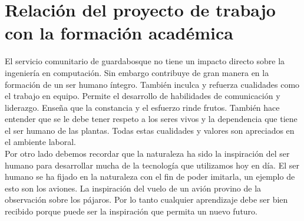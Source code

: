 \chapter*{Relación del proyecto de trabajo con la formación académica}

El servicio comunitario de guardabosque no tiene un impacto directo sobre la ingeniería en computación. Sin embargo contribuye de gran manera en la formación de un ser humano íntegro. También inculca y refuerza cualidades como el trabajo en equipo. Permite el desarrollo de habilidades de comunicación y liderazgo. Enseña que la constancia y el esfuerzo rinde frutos. También hace entender que se le debe tener respeto a los seres vivos y la dependencia que tiene el ser humano de las plantas. Todas estas cualidades y valores son apreciados en el ambiente laboral.
\\

Por otro lado debemos recordar que la naturaleza ha sido la inspiración del ser humano para desarrollar mucha de la tecnología que utilizamos hoy en día. El ser humano se ha fijado en la naturaleza con el fin de poder imitarla, un ejemplo de esto son los aviones. La inspiración del vuelo de un avión provino de la observación sobre los pájaros. Por lo tanto cualquier aprendizaje debe ser bien recibido porque puede ser la inspiración que permita un nuevo futuro.
